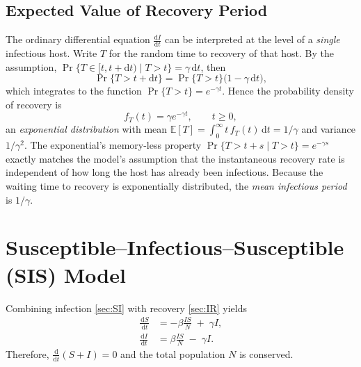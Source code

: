 \documentclass[11pt]{article}
\newcommand{\dd}{\,\mathrm{d}}
\begin{document}
\subsection*{Expected Value of Recovery Period}
The ordinary differential equation \(\frac{\mathrm{d}I}{\mathrm{d}t}\) can be interpreted
at the level of a \emph{single} infectious host.  Write \(T\) for the random time
to recovery of that host. By the assumption, \(\Pr\{T\in[t,t+\mathrm dt)\mid T>t\}=\gamma\,\mathrm dt\), then
\begin{equation*}
\Pr\{T>t+\mathrm dt\}
  =\Pr\{T>t\}\bigl(1-\gamma\,\mathrm dt\bigr),
\end{equation*}
which integrates to the function
\(\Pr\{T>t\}=e^{-\gamma t}\).  Hence the probability density of recovery is
\begin{equation*}
f_{T}(t)=\gamma e^{-\gamma t},\qquad t\ge 0,
\end{equation*}
an \emph{exponential distribution} with mean
\(\mathbb E[T]=\int_{0}^{\infty} t\,f_{T}(t)\,\mathrm dt=1/\gamma\) and variance
\(1/\gamma^{2}\).  The exponential’s memory-less property
\(\Pr\{T>t+s\mid T>t\}=e^{-\gamma s}\) exactly matches the model’s assumption
that the instantaneous recovery rate is independent of how long the host has
already been infectious. 
Because the waiting time to recovery is exponentially distributed, the \emph{mean infectious period} is $1/\gamma$.

\section{Susceptible–Infectious–Susceptible (SIS) Model}\label{sec:SIS}

Combining infection \cref{sec:SI} with
recovery \cref{sec:IR} yields
\begin{align*}
  \frac{\dd S}{\dd t} &= -\beta \frac{I S}{N} \;+\; \gamma I, \\
  \frac{\dd I}{\dd t} &=  \beta \frac{I S}{N} \;-\; \gamma I.
\end{align*}
Therefore, \(
\frac{\mathrm d}{\mathrm dt}(S+I)=0
\)
and the total population \(N\) is conserved.

\end{document}
